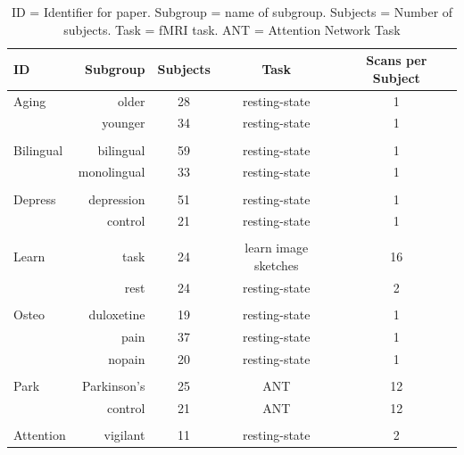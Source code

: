 \documentclass[12pt]{spieman}  %
\begin{document}
\begin{spacing}{2}
\begin{table}[h!]
\caption{
    ID = Identifier for paper. Subgroup = name of subgroup. Subjects = Number of subjects.
    Task = fMRI task. ANT = Attention Network Task \cite{fanActivationAttentionalNetworks2005}
}
\label{table:2}
\small
\centering
\begin{tabular}{ l r c c c }
\hline
\textbf{ID}  & \textbf{Subgroup}  & \textbf{Subjects}  & \textbf{Task} & \textbf{Scans per Subject} \\
\hline
Aging   &  older             & 28      & resting-state        & 1 \\
        &  younger           & 34      & resting-state        & 1 \\
        &                    &         &                      &   \\
Bilingual  &  bilingual          & 59      & resting-state    & 1 \\
        &  monolingual        & 33      & resting-state       & 1 \\
        &                    &         &                      &   \\
Depress &  depression         & 51      & resting-state       & 1 \\
        &  control            & 21      & resting-state       & 1 \\
        &                    &         &                      &   \\
Learn   &  task              & 24      & learn image sketches & 16\\
        &  rest              & 24      & resting-state        & 2 \\
        &                    &         &                      &   \\
Osteo   &  duloxetine        & 19      & resting-state        & 1 \\
        &  pain              & 37      & resting-state        & 1 \\
        &  nopain            & 20      & resting-state        & 1 \\
        &                    &         &                      &   \\
Park    &  Parkinson's       & 25      & ANT                  & 12\\
        &  control           & 21      & ANT                  & 12\\
        &                    &         &                      &   \\
Attention&  vigilant           & 11     & resting-state       & 2 \\

\end{tabular}
\end{table}
\end{spacing}
\end{document}

